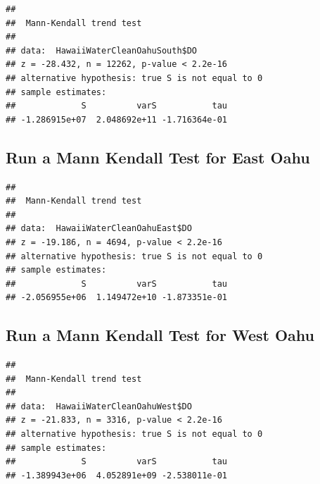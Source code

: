 \documentclass[12pt,]{article}
\newenvironment{Shaded}{\begin{snugshade}}{\end{snugshade}}
\newcommand{\KeywordTok}[1]{\textcolor[rgb]{0.13,0.29,0.53}{\textbf{#1}}}
\newcommand{\OperatorTok}[1]{\textcolor[rgb]{0.81,0.36,0.00}{\textbf{#1}}}
\newcommand{\NormalTok}[1]{#1}
\begin{document}
\begin{verbatim}
## 
##  Mann-Kendall trend test
## 
## data:  HawaiiWaterCleanOahuSouth$DO
## z = -28.432, n = 12262, p-value < 2.2e-16
## alternative hypothesis: true S is not equal to 0
## sample estimates:
##             S          varS           tau 
## -1.286915e+07  2.048692e+11 -1.716364e-01
\end{verbatim}

\subsection{Run a Mann Kendall Test for East
Oahu}\label{run-a-mann-kendall-test-for-east-oahu}

\begin{Shaded}
\end{Shaded}

\begin{verbatim}
## 
##  Mann-Kendall trend test
## 
## data:  HawaiiWaterCleanOahuEast$DO
## z = -19.186, n = 4694, p-value < 2.2e-16
## alternative hypothesis: true S is not equal to 0
## sample estimates:
##             S          varS           tau 
## -2.056955e+06  1.149472e+10 -1.873351e-01
\end{verbatim}

\subsection{Run a Mann Kendall Test for West
Oahu}\label{run-a-mann-kendall-test-for-west-oahu}

\begin{Shaded}
\end{Shaded}

\begin{verbatim}
## 
##  Mann-Kendall trend test
## 
## data:  HawaiiWaterCleanOahuWest$DO
## z = -21.833, n = 3316, p-value < 2.2e-16
## alternative hypothesis: true S is not equal to 0
## sample estimates:
##             S          varS           tau 
## -1.389943e+06  4.052891e+09 -2.538011e-01
\end{verbatim}
\end{document}
